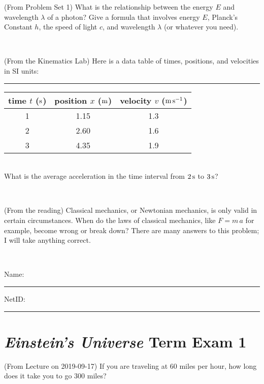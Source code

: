 \documentclass[12pt, letterpaper]{article}
\begin{document}
\begin{problem} (From Problem Set 1)
What is the relationship between the energy $E$ and wavelength
$\lambda$ of a photon? Give a formula that involves energy $E$,
Planck's Constant $h$, the speed of light $c$, and wavelength
$\lambda$ (or whatever you need).
\end{problem}

\vfill ~

\begin{problem} (From the Kinematics Lab)
Here is a data table of times, positions, and velocities in SI units:\\
\rule{1.0in}{0pt}\begin{tabular}{c|c|c}
time $t$ ($\mathrm{s}$) & position $x$ ($\mathrm{m}$) & velocity $v$ ($\mathrm{m}\,\mathrm{s}^{-1}$) \\
\hline
1 & 1.15 & 1.3 \\
2 & 2.60 & 1.6 \\
3 & 4.35 & 1.9 \\
\hline
\end{tabular}\\
What is the average acceleration in the time interval from $2\,\mathrm{s}$ to $3\,\mathrm{s}$?
\end{problem}


\vfill ~

\begin{problem} (From the reading)
Classical mechanics, or Newtonian mechanics, is only valid in certain
circumstances. When do the laws of classical mechanics, like $F =
m\,a$ for example, become wrong or break down? There are many answers
to this problem; I will take anything correct.
\end{problem}


\vfill ~


\cleardoublepage



\noindent
Name: \rule[-1ex]{0.60\textwidth}{0.1pt}
NetID: \rule[-1ex]{0.20\textwidth}{0.1pt}

\section*{\textsl{Einstein's Universe} Term Exam 1}
\setcounter{problem}{1}


\begin{problem} (From Lecture on 2019-09-17)
If you are traveling at 60 miles per hour, how long does
it take you to go 300 miles?
\end{problem}


\vfill ~
\end{document}
